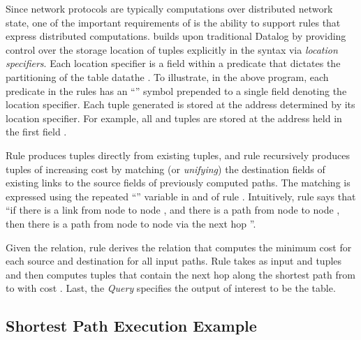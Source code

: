Since network protocols are typically computations over distributed
network state, one of the important requirements of \Dlog is the
ability to support rules that express distributed computations. \Dlog
builds upon traditional Datalog by providing control over the storage
location of tuples explicitly in the syntax via {\em location
  specifiers}. Each location specifier is a field within a
predicate that dictates the partitioning of the table datathe .  To
illustrate, in the above program, each predicate in the \Dlog rules
has an ``'' symbol prepended to a single field denoting the
location specifier. Each tuple generated is stored at the address
determined by its location specifier. For example, all  and
 tuples are stored  at the address held in the first
field .


Rule  produces  tuples directly from existing
 tuples, and rule  recursively produces 
tuples of increasing cost by matching (or {\em unifying}) the
destination fields of existing links to the source fields of
previously computed paths. The matching is expressed using the
repeated ``'' variable in  and
 of rule . Intuitively, rule  says
that ``if there is a link from node  to node , and there
is a path from node  to node , then there is a path 
from node  to node  via the next hop ''.
 
Given the  relation, rule  derives the relation
 that computes the minimum cost  for each
source and destination for all input paths. Rule
 takes as input  and  tuples and then
computes  tuples that contain the next hop
along the shortest path from  to  with cost
. Last, the {\em Query} specifies the output of interest to be
the  table.


\subsection{Shortest Path Execution Example}
\label{sec:queryExec}

